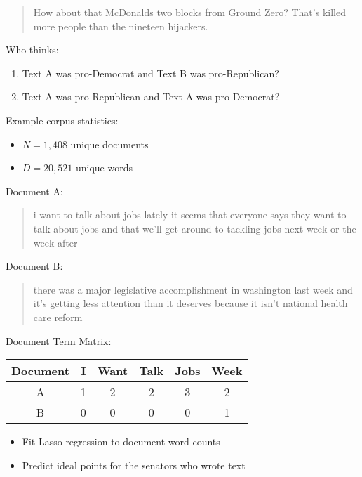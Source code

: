 \documentclass[xcolor=pdftex,dvipsnames,table]{beamer}
\begin{document}
\frame
{
	\begin{quote}
		How about that McDonalds two blocks from Ground Zero? That's killed more people than the nineteen hijackers.
	\end{quote}
}

\frame
{
	Who thinks:
	\begin{enumerate}
		\item{Text A was pro-Democrat and Text B was pro-Republican?}
		\item{Text A was pro-Republican and Text A was pro-Democrat?}
	\end{enumerate}
}

\frame
{
	Example corpus statistics:
	\begin{itemize}
		\item{$N = 1,408$ unique documents}
		\item{$D = 20,521$ unique words}
	\end{itemize}
}

\frame
{
	Document A:
	\begin{quote}
	i want to talk about jobs lately it seems that everyone says they want to talk about jobs and that we'll get around to tackling jobs next week or the week after
	\end{quote}
}

\frame
{
	Document B:
	\begin{quote}
	there was a major legislative accomplishment in washington last week and it's getting less attention than it deserves because it isn't national health care reform
	\end{quote}
}

\frame
{
	Document Term Matrix:
	\begin{table}[htdp]
	\begin{center}
	\begin{tabular}{|c|c|c|c|c|c|}
	\hline
	Document & I & Want & Talk & Jobs & Week \\
	\hline
	A & 1 & 2 & 2 & 3 & 2 \\
	B & 0 & 0 & 0 & 0 & 1 \\
	\hline
	\end{tabular}
	\end{center}
	\end{table}
}

\frame
{
	\begin{itemize}
		\item{Fit Lasso regression to document word counts}
		\item{Predict ideal points for the senators who wrote text}
	\end{itemize}
}
\end{document}
